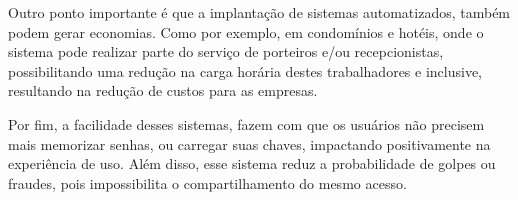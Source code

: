 Outro ponto importante é que a implantação de sistemas automatizados, também 
podem gerar economias. Como por exemplo, em condomínios e hotéis, onde o 
sistema pode realizar parte do serviço de porteiros e/ou recepcionistas, 
possibilitando uma redução na carga horária destes trabalhadores e 
inclusive, resultando na redução de custos para as empresas.

Por fim, a facilidade desses sistemas, fazem com que os usuários não precisem 
mais memorizar senhas, ou carregar suas chaves, impactando positivamente na 
experiência de uso. Além disso, esse sistema reduz a probabilidade de golpes 
ou fraudes, pois impossibilita o compartilhamento do mesmo acesso.

